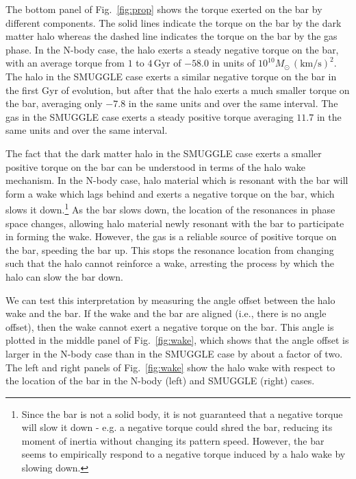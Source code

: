 \documentclass{natureprintstyle}
\begin{document}
The bottom panel of Fig.~\ref{fig:prop} shows the torque exerted on the bar by
different components. The solid lines indicate the torque on the bar by the
dark matter halo whereas the dashed line indicates the torque on the bar by
the gas phase. In the N-body case, the halo exerts a steady negative torque on
the bar, with an average torque from $1$ to $4\,\textrm{Gyr}$ of $-58.0$ in
units of $10^{10}M_{\odot}\,(\textrm{km}/\textrm{s})^2$. The halo in the
SMUGGLE case exerts a similar negative torque on the bar in the first Gyr of
evolution, but after that the halo exerts a much smaller torque on the bar,
averaging only $-7.8$ in the same units and over the same interval. The gas in
the SMUGGLE case exerts a steady positive torque averaging $11.7$ in the same
units and over the same interval.

The fact that the dark matter halo in the SMUGGLE case exerts a smaller
positive torque on the bar can be understood in terms of the halo wake
mechanism. In the N-body case, halo material which is resonant with the bar
will form a wake which lags behind and exerts a negative torque on the bar,
which slows it down.\cite{1984MNRAS.209..729T, 1985MNRAS.213..451W,
1992ApJ...400...80H}\footnote{Since the bar is not a solid body, it is not
guaranteed that a negative torque will slow it down - e.g. a negative torque
could shred the bar, reducing its moment of inertia without changing its
pattern speed. However, the bar seems to empirically respond to a negative
torque induced by a halo wake by slowing down.} As the bar slows down, the
location of the resonances in phase space changes, allowing halo material
newly resonant with the bar to participate in forming the wake. However, the
gas is a reliable source of positive torque on the bar, speeding the bar up.
This stops the resonance location from changing such that the halo cannot
reinforce a wake, arresting the process by which the halo can slow the bar
down.

We can test this interpretation by measuring the angle offset between the halo
wake and the bar. If the wake and the bar are aligned (i.e., there is no angle
offset), then the wake cannot exert a negative torque on the bar. This angle
is plotted in the middle panel of Fig.~\ref{fig:wake}, which shows that the
angle offset is larger in the N-body case than in the SMUGGLE case by about a
factor of two. The left and right panels of Fig.~\ref{fig:wake} show the halo
wake with respect to the location of the bar in the N-body (left) and SMUGGLE
(right) cases.
\end{document}
